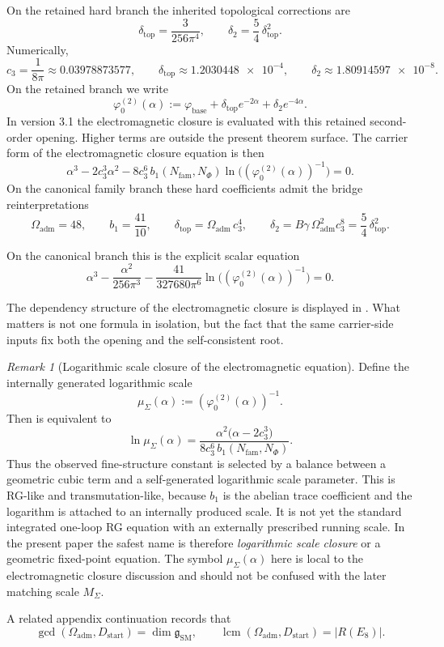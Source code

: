 \documentclass[11pt,a4paper]{article}
\theoremstyle{definition}
\theoremstyle{remark}
\newtheorem*{remark}{Remark}
\newcommand{\cthree}{c_3}
\newcommand{\phibase}{\varphi_{\mathrm{base}}}
\newcommand{\phiztwo}{\varphi_0^{(2)}}
\newcommand{\deltatop}{\delta_{\mathrm{top}}}
\newcommand{\bone}{b_1}
\newcommand{\SM}{\mathrm{SM}}
\newcommand{\Oadm}{\Omega_{\mathrm{adm}}}
\newcommand{\Dstart}{D_{\mathrm{start}}}
\begin{document}
On the retained hard branch the inherited topological corrections are
\begin{equation}
\label{eq:hard-topological-kernel}
\deltatop=\frac{3}{256\pi^4},
\qquad
\delta_2=\frac54\,\deltatop^2.
\end{equation}
Numerically,
\[
\cthree=\frac{1}{8\pi}\approx \num{0.03978873577},
\qquad
\deltatop\approx \num{1.2030448e-4},
\qquad
\delta_2\approx \num{1.80914597e-8}.
\]
On the retained branch we write
\begin{equation}
\label{eq:phi-opening}
\phiztwo(\alpha)
:=
\phibase
+ \deltatop e^{-2\alpha}
+ \delta_2 e^{-4\alpha}.
\end{equation}
In version 3.1 the electromagnetic closure is evaluated with this retained
second-order opening. Higher terms are outside the present theorem surface.
The carrier form of the electromagnetic closure equation is then
\label{eq:carrier-cfe}
\[
\alpha^3
-2\cthree^3\alpha^2
-8\cthree^6\,\bone(N_{\mathrm{fam}},N_\Phi)
\ln\!\bigl((\phiztwo(\alpha))^{-1}\bigr)\tag{\theequation}
=0.
\]
On the canonical family branch these hard coefficients admit the bridge reinterpretations
\[
\Oadm=48,
\qquad
\bone=\frac{41}{10},
\qquad
\deltatop=\Oadm\,\cthree^4,
\qquad
\delta_2=B\gamma\,\Oadm^2\cthree^8=\frac54\,\deltatop^2.
\]

On the canonical branch this is the explicit scalar equation
\[
\alpha^3-\frac{\alpha^2}{256\pi^3}-\frac{41}{327680\pi^6}\ln\!\bigl((\phiztwo(\alpha))^{-1}\bigr)=0.
\]

The dependency structure of the electromagnetic closure is displayed in . What matters is not one formula in isolation, but the fact that the same carrier-side inputs fix both the opening and the self-consistent root.
\begin{remark}[Logarithmic scale closure of the electromagnetic equation]
Define the internally generated logarithmic scale
\[
\mu_\Sigma(\alpha):=(\phiztwo(\alpha))^{-1}.
\]
Then  is equivalent to
\[
\ln \mu_\Sigma(\alpha)
=
\frac{\alpha^2\bigl(\alpha-2\cthree^3\bigr)}
{8\cthree^6\,\bone(N_{\mathrm{fam}},N_\Phi)}.
\]
Thus the observed fine-structure constant is selected by a balance between a geometric cubic term and a self-generated logarithmic scale parameter. This is RG-like and transmutation-like, because $\bone$ is the abelian trace coefficient and the logarithm is attached to an internally produced scale. It is not yet the standard integrated one-loop RG equation with an externally prescribed running scale. In the present paper the safest name is therefore \emph{logarithmic scale closure} or a geometric fixed-point equation. The symbol $\mu_\Sigma(\alpha)$ here is local to the electromagnetic closure discussion and should not be confused with the later matching scale $M_\Sigma$.
\end{remark}
A related appendix continuation records that
\[
\gcd(\Oadm,\Dstart)=\dim \mathfrak g_{\SM},
\qquad
\operatorname{lcm}(\Oadm,\Dstart)=|R(E_8)|.
\]
\end{document}

